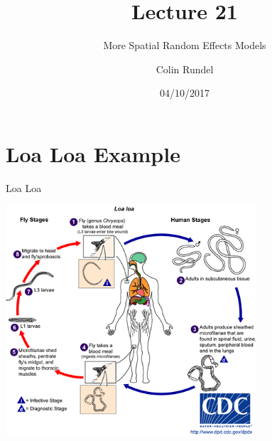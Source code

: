 \documentclass[11pt,ignorenonframetext,]{beamer}
\title{Lecture 21}
\subtitle{More Spatial Random Effects Models}
\author{Colin Rundel}
\date{04/10/2017}
\begin{document}
\frame{\titlepage}

\section{Loa Loa Example}\label{loa-loa-example}

\begin{frame}{Loa Loa}

\begin{center}
\includegraphics[width=0.7\textwidth]{figs/loa_loa_LifeCycle.png}
\end{center}

\end{frame}
\end{document}
